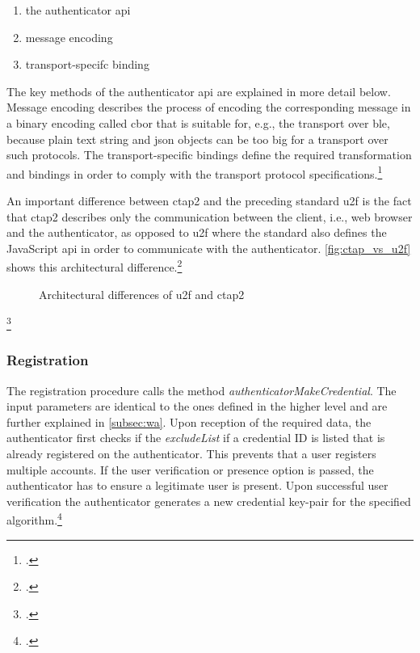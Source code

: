 \begin{enumerate}
	\item the authenticator \gls{api}
	\item message encoding
	\item transport-specifc binding
\end{enumerate}

The key methods of the authenticator \gls{api} are explained in more detail below. Message encoding describes the process of encoding the corresponding message in a binary encoding called \gls{cbor} that is suitable for, e.g., the transport over \gls{ble}, because plain text string and \gls{json} objects can be too big for a transport over such protocols. The transport-specific bindings define the required transformation and bindings in order to comply with the transport protocol specifications.\footcites[See][4--5]{ctap2}

An important difference between \gls{ctap}2 and the preceding standard \gls{u2f} is the fact that \gls{ctap}2 describes only the communication between the client, i.e., web browser and the authenticator, as opposed to \gls{u2f} where the standard also defines the JavaScript \gls{api} in order to communicate with the authenticator. \autoref{fig:ctap_vs_u2f} shows this architectural difference.\footcites[See][51]{kim-new-way-fido}[See][254]{Schwartz2018}

\begin{figure}[hbt]
	\centering
	
	\caption[Architectural differences of \gls{u2f} and \gls{ctap}2]{Architectural differences of \gls{u2f} and \gls{ctap}2\footnotemark}
	\label{fig:ctap_vs_u2f}
\end{figure}
\footcitetexts[Source: diagram by author, based on][4]{u2f-overview}[][Chapter 6]{w3c}

\subsubsection{Registration}

The registration procedure calls the method \textit{authenticatorMakeCredential}. The input parameters are identical to the ones defined in the higher level \wa{} and are further explained in \autoref{subsec:wa}. Upon reception of the required data, the authenticator first checks if the \textit{excludeList} if a credential ID is listed that is already registered on the authenticator. This prevents that a user registers multiple accounts. If the user verification or presence option is passed, the authenticator has to ensure a legitimate user is present. Upon successful user verification the authenticator generates a new credential key-pair for the specified algorithm.\footcites[See][9]{ctap2}

